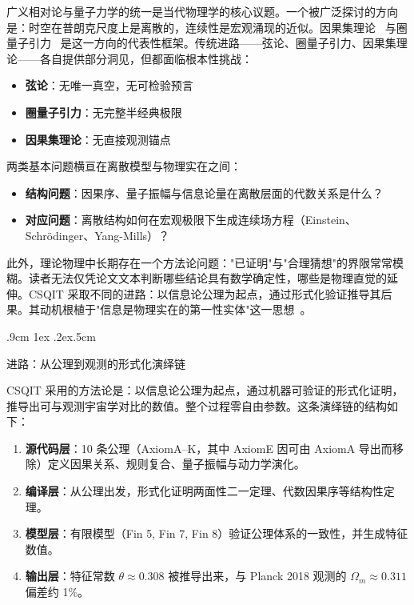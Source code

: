 \documentclass[aps,prd,twocolumn,nofootinbib,floatfix]{revtex4-2}
\makeatletter
\def\subsection{%
  \@startsection{subsection}{2}{\z@}
    {.9cm \@plus1ex \@minus .2ex}{.5cm}
    {\normalfont\large\bfseries\raggedright}%
}
\makeatother
\begin{document}
广义相对论与量子力学的统一是当代物理学的核心议题。一个被广泛探讨的方向是：时空在普朗克尺度上是离散的，连续性是宏观涌现的近似。因果集理论~\cite{Bombelli1987,Sorkin2005} 与圈量子引力~\cite{Ambjorn1995} 是这一方向的代表性框架。传统进路——弦论、圈量子引力、因果集理论——各自提供部分洞见，但都面临根本性挑战：

\begin{itemize}
    \item \textbf{弦论}：无唯一真空，无可检验预言
    \item \textbf{圈量子引力}：无完整半经典极限
    \item \textbf{因果集理论}：无直接观测锚点
\end{itemize}

两类基本问题横亘在离散模型与物理实在之间：

\begin{itemize}
    \item \textbf{结构问题}：因果序、量子振幅与信息论量在离散层面的代数关系是什么？
    \item \textbf{对应问题}：离散结构如何在宏观极限下生成连续场方程（Einstein、Schr\"odinger、Yang-Mills）？
\end{itemize}

此外，理论物理中长期存在一个方法论问题："已证明"与"合理猜想"的界限常常模糊。读者无法仅凭论文文本判断哪些结论具有数学确定性，哪些是物理直觉的延伸。CSQIT 采取不同的进路：以信息论公理为起点，通过形式化验证推导其后果。其动机根植于"信息是物理实在的第一性实体"这一思想~\cite{Wheeler1989}。

\subsection{进路：从公理到观测的形式化演绎链}

CSQIT 采用的方法论是：以信息论公理为起点，通过机器可验证的形式化证明，推导出可与观测宇宙学对比的数值。整个过程零自由参数。这条演绎链的结构如下：

\begin{enumerate}
    \item \textbf{源代码层}：10 条公理（AxiomA--K，其中 AxiomE 因可由 AxiomA 导出而移除）定义因果关系、规则复合、量子振幅与动力学演化。
    \item \textbf{编译层}：从公理出发，形式化证明两面性二一定理、代数因果序等结构性定理。
    \item \textbf{模型层}：有限模型（Fin 5, Fin 7, Fin 8）验证公理体系的一致性，并生成特征数值。
    \item \textbf{输出层}：特征常数 $\theta \approx 0.308$ 被推导出来，与 Planck 2018 观测的 $\Omega_m \approx 0.311$ 偏差约 1\%。
\end{enumerate}
\end{document}
